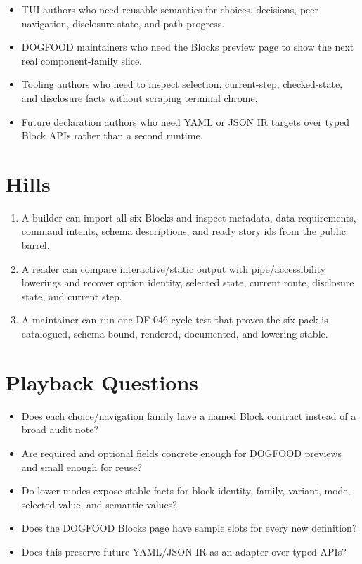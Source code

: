 \begin{itemize}
\tightlist
\item
  TUI authors who need reusable semantics for choices, decisions, peer navigation, disclosure state, and path progress.
\item
  DOGFOOD maintainers who need the Blocks preview page to show the next real component-family slice.
\item
  Tooling authors who need to inspect selection, current-step, checked-state, and disclosure facts without scraping terminal chrome.
\item
  Future declaration authors who need YAML or JSON IR targets over typed Block APIs rather than a second runtime.
\end{itemize}

\section{Hills}\label{record-096-hills}

\begin{enumerate}
\def\labelenumi{\arabic{enumi}.}
\tightlist
\item
  A builder can import all six Blocks and inspect metadata, data requirements, command intents, schema descriptions, and ready story ids from the public barrel.
\item
  A reader can compare interactive/static output with pipe/accessibility lowerings and recover option identity, selected state, current route, disclosure state, and current step.
\item
  A maintainer can run one DF-046 cycle test that proves the six-pack is catalogued, schema-bound, rendered, documented, and lowering-stable.
\end{enumerate}

\section{Playback Questions}\label{record-096-playback-questions}

\begin{itemize}
\tightlist
\item
  Does each choice/navigation family have a named Block contract instead of a broad audit note?
\item
  Are required and optional fields concrete enough for DOGFOOD previews and small enough for reuse?
\item
  Do lower modes expose stable facts for block identity, family, variant, mode, selected value, and semantic values?
\item
  Does the DOGFOOD Blocks page have sample slots for every new definition?
\item
  Does this preserve future YAML/JSON IR as an adapter over typed APIs?
\end{itemize}

